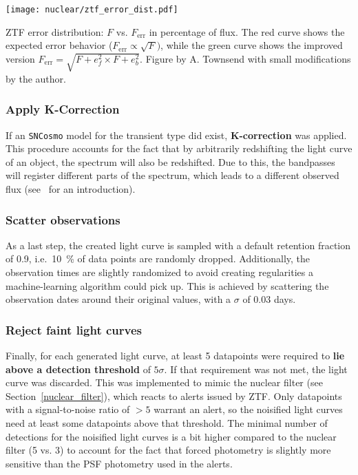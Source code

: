 \begin{marginfigure}
  \texttt{[image: nuclear/ztf\_error\_dist.pdf]}
  \caption[ZTF error distribution]{ZTF error distribution: $F$ vs. $F_\text{err}$ in percentage of flux. The red curve shows the expected error behavior ($F_\text{err}\propto \sqrt{F})$, while the green curve shows the improved version $F_\text{err} = \sqrt{F + e_f^2\times F + e_b^2}$. Figure by A. Townsend with small modifications by the author.}
\end{marginfigure}

\subsubsection{Apply K-Correction}
If an \texttt{SNCosmo} model for the transient type did exist, \textbf{K-correction} was applied. This procedure accounts for the fact that by arbitrarily redshifting the light curve of an object, the spectrum will also be redshifted. Due to this, the bandpasses will register different parts of the spectrum, which leads to a different observed flux (see~ for an introduction).

\subsubsection{Scatter observations}
As a last step, the created light curve is sampled with a default retention fraction of 0.9, i.e.~\SI{10}{\percent} of data points are randomly dropped. Additionally, the observation times are slightly randomized to avoid creating regularities a machine-learning algorithm could pick up. This is achieved by scattering the observation dates around their original values, with a $\sigma$ of $0.03$ days.

\subsubsection{Reject faint light curves}
Finally, for each generated light curve, at least 5 datapoints were required to \textbf{lie above a detection threshold} of $5 \sigma$. If that requirement was not met, the light curve was discarded. This was implemented to mimic the nuclear filter (see Section~\ref{nuclear_filter}), which reacts to alerts issued by ZTF. Only datapoints with a signal-to-noise ratio of $>5$ warrant an alert, so the noisified light curves need at least some datapoints above that threshold. The minimal number of detections for the noisified light curves is a bit higher compared to the nuclear filter (5 vs. 3) to account for the fact that forced photometry is slightly more sensitive than the PSF photometry used in the alerts.

